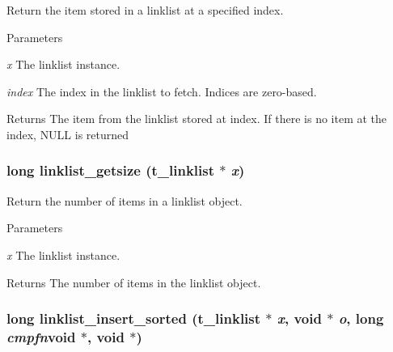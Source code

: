 Return the item stored in a linklist at a specified index. 
\begin{DoxyParams}{Parameters}
\item[{\em x}]The linklist instance. \item[{\em index}]The index in the linklist to fetch. Indices are zero-\/based. \end{DoxyParams}
\begin{DoxyReturn}{Returns}
The item from the linklist stored at index. If there is no item at the index, {\ttfamily NULL} is returned 
\end{DoxyReturn}
\hypertarget{group__linklist_ga71472259406fa8ceb8fad80d23259357}{
\subsubsection[{linklist\_\-getsize}]{\setlength{\rightskip}{0pt plus 5cm}long linklist\_\-getsize ({\bf t\_\-linklist} $\ast$ {\em x})}}
\label{group__linklist_ga71472259406fa8ceb8fad80d23259357}


Return the number of items in a linklist object. 
\begin{DoxyParams}{Parameters}
\item[{\em x}]The linklist instance. \end{DoxyParams}
\begin{DoxyReturn}{Returns}
The number of items in the linklist object. 
\end{DoxyReturn}
\hypertarget{group__linklist_gadac3bedb5a07ebf8f1b4751cc73a2c52}{
\subsubsection[{linklist\_\-insert\_\-sorted}]{\setlength{\rightskip}{0pt plus 5cm}long linklist\_\-insert\_\-sorted ({\bf t\_\-linklist} $\ast$ {\em x}, \/  void $\ast$ {\em o}, \/  long  {\em cmpfn}void $\ast$, void $\ast$)}}
\label{group__linklist_gadac3bedb5a07ebf8f1b4751cc73a2c52}



